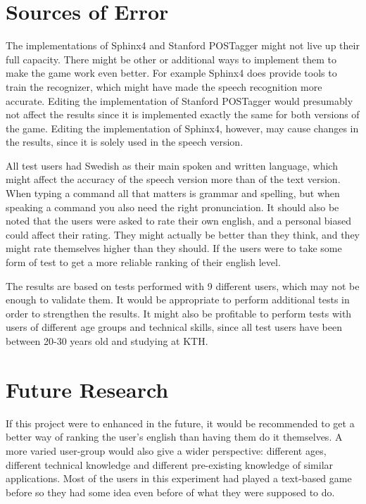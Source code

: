 \section{Sources of Error} %
The implementations of Sphinx4 and Stanford POSTagger might not live up their full capacity. There might be other or additional ways to implement them to make the game work even better. For example Sphinx4 does provide tools to train the recognizer, which might have made the speech recognition more accurate. Editing the implementation of Stanford POSTagger would presumably not affect the results since it is implemented exactly the same for both versions of the game. Editing the implementation of Sphinx4, however, may cause changes in the results, since it is solely used in the speech version.

All test users had Swedish as their main spoken and written language, which might affect the accuracy of the speech version more than of the text version. When typing a command all that matters is grammar and spelling, but when speaking a command you also need the right pronunciation. It should also be noted that the users were asked to rate their own english, and a personal biased could affect their rating. They might actually be better than they think, and they might rate themselves higher than they should. If the users were to take some form of test to get a more reliable ranking of their english level.

The results are based on tests performed with 9 different users, which may not be enough to validate them. It would be appropriate to perform additional tests in order to strengthen the results. It might also be profitable to perform tests with users of different age groups and technical skills, since all test users have been between 20-30 years old and studying at KTH.

\section{Future Research}
If this project were to enhanced in the future, it would be recommended to get a better way of ranking the user's english than having them do it themselves. A more varied user-group would also give a wider perspective: different ages, different technical knowledge and different pre-existing knowledge of similar applications. Most of the users in this experiment had played a text-based game before so they had some idea even before of what they were supposed to do.
